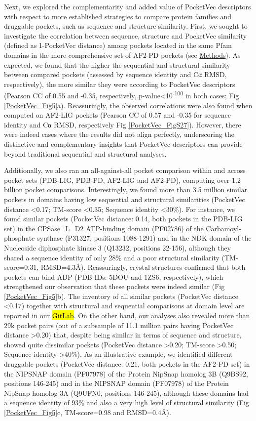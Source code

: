 Next, we explored the complementarity and added value of PocketVec descriptors with respect to more established strategies to compare protein families and druggable pockets, such as sequence and structure similarity. First, we sought to investigate the correlation between sequence, structure and PocketVec similarity (defined as 1-PocketVec distance) among pockets located in the same Pfam domains in the more comprehensive set of AF2-PD pockets (see \hyperref[PocketVec_Methods]{Methods}). As expected, we found that the higher the sequential and structural similarity between compared pockets (assessed by sequence identity and Cα RMSD, respectively), the more similar they were according to PocketVec descriptors (Pearson CC of 0.55 and -0.35, respectively, p-value<10\textsuperscript{-100} in both cases; Fig \ref{PocketVec_Fig5}a). Reassuringly, the observed correlations were also found when computed on AF2-LIG pockets (Pearson CC of 0.57 and -0.35 for sequence identity and Cα RMSD, respectively Fig \ref{PocketVec_FigS27}). However, there were indeed cases where the results did not align perfectly, underscoring the distinctive and complementary insights that PocketVec descriptors can provide beyond traditional sequential and structural analyses.

Additionally, we also ran an all-against-all pocket comparison within and across pocket sets (PDB-LIG, PDB-PD, AF2-LIG and AF2-PD), computing over 1.2 billion pocket comparisons. Interestingly, we found more than 3.5 million similar pockets in domains having low sequential and structural similarities (PocketVec distance <0.17; TM-score <0.35; Sequence identity <30\%). For instance, we found similar pockets (PocketVec distance: 0.14, both pockets in the PDB-LIG set) in the CPSase\_L\_D2 ATP-binding domain (PF02786) of the Carbamoyl-phosphate synthase (P31327, positions 1088-1291) and in the NDK domain of the Nucleoside diphosphate kinase 3 (Q13232, positions 22-156), although they shared a sequence identity of only 28\% and a poor structural similarity (TM-score=0.31, RMSD=4.3Å). Reassuringly, crystal structures confirmed that both pockets can bind ADP (PDB IDs: 5DOU and 1ZS6, respectively), which strengthened our observation that these pockets were indeed similar (Fig \ref{PocketVec_Fig5}b). The inventory of all similar pockets (PocketVec distance <0.17) together with structural and sequential comparisons at domain level are reported in our \hl{GitLab}. On the other hand, our analyses also revealed more than 29k pocket pairs (out of a subsample of 11.1 million pairs having PocketVec distance >0.20) that, despite being similar in terms of sequence and structure, showed quite dissimilar pockets (PocketVec distance >0.20; TM-score >0.50; Sequence identity >40\%). As an illustrative example, we identified different druggable pockets (PocketVec distance: 0.21, both pockets in the AF2-PD set) in the NIPSNAP domain (PF07978) of the Protein NipSnap homolog 3B (Q9BS92, positions 146-245) and in the NIPSNAP domain (PF07978) of the Protein NipSnap homolog 3A (Q9UFN0, positions 146-245), although these domains had a sequence identity of 93\% and also a very high level of structural similarity (Fig \ref{PocketVec_Fig5}c, TM-score=0.98 and RMSD=0.4Å).

